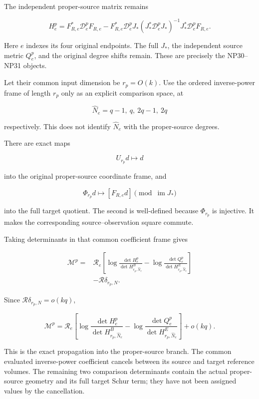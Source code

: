 \documentclass[11pt]{article}
\begin{document}
The independent proper-source matrix remains

\[
H_e^p
=
F_{R,e}^*\mathcal D_e^pF_{R,e}
-
F_{R,e}^*\mathcal D_e^pJ_*
(J_*^*\mathcal D_e^pJ_*)^{-1}
J_*^*\mathcal D_e^pF_{R,e}.
\tag{51}
\]

Here \(e\) indexes its four original endpoints. The full \(J_*\), the independent source metric \(Q_e^p\), and the original degree shifts remain. These are precisely the NP30--NP31 objects.

Let their common input dimension be \(r_p=O(k)\). Use the ordered inverse-power frame of length \(r_p\) only as an explicit comparison space, at

\[
\widehat N_e=q-1,\ q,\ 2q-1,\ 2q
\]

respectively. This does not identify \(\widehat N_e\) with the proper-source degrees.

There are exact maps

\[
U_{r_p}d\longmapsto d
\]

into the original proper-source coordinate frame, and

\[
\Phi_{r_p}d\longmapsto[F_{R,e}d]\pmod{\operatorname{im}J_*}
\]

into the full target quotient. The second is well-defined because \(\Phi_{r_p}\) is injective. It makes the corresponding source--observation square commute.

Taking determinants in that common coefficient frame gives

\[
\boxed{
\begin{aligned}
\mathcal M^p
={}&
\mathcal R_e
\left[
\log\frac{\det H_e^p}{\det H^B_{r_p,\widehat N_e}}
-
\log\frac{\det Q_e^p}{\det H^E_{r_p,\widehat N_e}}
\right]\\
&-\mathcal R\delta_{r_p,N}.
\end{aligned}
}
\tag{52}
\]

Since \(\mathcal R\delta_{r_p,N}=o(kq)\),

\[
\boxed{
\mathcal M^p
=
\mathcal R_e
\left[
\log\frac{\det H_e^p}{\det H^B_{r_p,\widehat N_e}}
-
\log\frac{\det Q_e^p}{\det H^E_{r_p,\widehat N_e}}
\right]
+o(kq).
}
\tag{53}
\]

This is the exact propagation into the proper-source branch. The common evaluated inverse-power coefficient cancels between its source and target reference volumes. The remaining two comparison determinants contain the actual proper-source geometry and its full target Schur term; they have not been assigned values by the cancellation.
\end{document}
